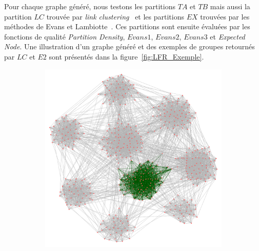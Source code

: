 Pour chaque graphe généré, nous testons les partitions $TA$ et $TB$ mais aussi la partition $LC$ trouvée par \emph{link clustering}~\cite{Ahn2010a} et les partitions $EX$ trouvées par les méthodes de Evans et Lambiotte~\cite{Evans2009}.
Ces partitions sont ensuite évaluées par les fonctions de qualité \emph{Partition Density}, $Evans1$, $Evans2$, $Evans3$ et \emph{Expected Node}.
Une illustration d'un graphe généré et des exemples de groupes retournés par $LC$ et $E2$ sont présentés dans la figure~\ref{fig:LFR_Exemple}.

\begin{figure}
\centering
	\begin{subfigure}{0.31\textwidth}
		\includegraphics[width=\linewidth]{img/ExpectedNodes/LF/Graphe_Complet_select.png}
		\caption{}
	\end{subfigure}
	\begin{subfigure}{0.31\textwidth}

\end{subfigure}
\end{figure}
